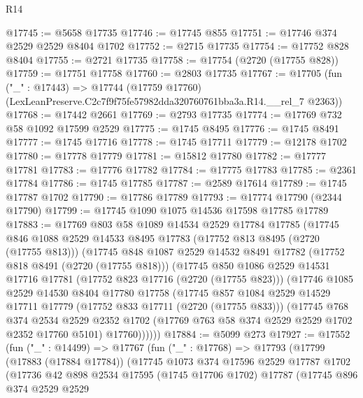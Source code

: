 \begin{lexlean}{R14}
\begin{coremodule}
@17745 := @5658 @17735
@17746 := @17745 @855
@17751 := @17746 @374 @2529 @2529 @8404 @1702
@17752 := @2715 @17735
@17754 := @17752 @828 @8404
@17755 := @2721 @17735
@17758 := @17754 (@2720 (@17755 @828))
@17759 := @17751 @17758
@17760 := @2803 @17735
@17767 := @17705
    (fun ("_" : @17443) =>
    @17744 (@17759 @17760) (LexLeanPreserve.C2c7f9f75fe57982dda320760761bba3a.R14.__rel_7 @2363))
@17768 := @17442 @2661
@17769 := @2793 @17735
@17774 := @17769 @732 @58 @1092 @17599 @2529
@17775 := @1745 @8495
@17776 := @1745 @8491
@17777 := @1745 @17716
@17778 := @1745 @17711
@17779 := @12178 @1702
@17780 := @17778 @17779
@17781 := @15812 @17780
@17782 := @17777 @17781
@17783 := @17776 @17782
@17784 := @17775 @17783
@17785 := @2361 @17784
@17786 := @1745 @17785
@17787 := @2589 @17614
@17789 := @1745 @17787 @1702
@17790 := @17786 @17789
@17793 := @17774 @17790 (@2344 @17790)
@17799 := @17745 @1090 @1075 @14536 @17598 @17785 @17789
@17883 := @17769
    @803
    @58
    @1089
    @14534
    @2529
    @17784
    @17785
    (@17745
      @846
      @1088
      @2529
      @14533
      @8495
      @17783
      (@17752 @813 @8495 (@2720 (@17755 @813)))
      (@17745
        @848
        @1087
        @2529
        @14532
        @8491
        @17782
        (@17752 @818 @8491 (@2720 (@17755 @818)))
        (@17745
          @850
          @1086
          @2529
          @14531
          @17716
          @17781
          (@17752 @823 @17716 (@2720 (@17755 @823)))
          (@17746
            @1085
            @2529
            @14530
            @8404
            @17780
            @17758
            (@17745
              @857
              @1084
              @2529
              @14529
              @17711
              @17779
              (@17752 @833 @17711 (@2720 (@17755 @833)))
              (@17745
                @768
                @374
                @2534
                @2529
                @2352
                @1702
                (@17769 @763 @58 @374 @2529 @2529 @1702 @2352 @17760 @5101)
                @17760))))))
@17884 := @5099 @273
@17927 := @17552
    (fun ("_" : @14499) =>
    @17767
      (fun ("_" : @17768) =>
      @17793
        (@17799
          (@17883 (@17884 @17784))
          (@17745
            @1073
            @374
            @17596
            @2529
            @17787
            @1702
            (@17736
              @42
              @898
              @2534
              @17595
              (@1745 @17706 @1702)
              @17787
              (@17745
                @896
                @374
                @2529
                @2529

\end{coremodule}
\end{lexlean}

